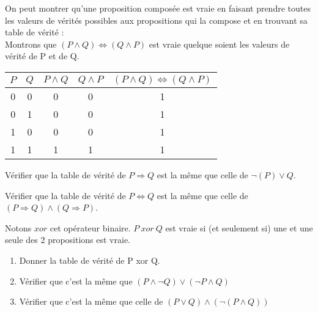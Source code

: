 \documentclass[a4paper,12pt,french]{book}
\begin{document}
\begin{methode}
	On peut montrer qu'une proposition composée est vraie en faisant prendre toutes les valeurs de vérités possibles aux propositions qui la compose et en trouvant sa table de vérité :\\
	
	Montrons que $(P\wedge Q)\Leftrightarrow(Q\wedge P)$ est vraie quelque soient les valeurs de vérité de P et de Q.
	
	\begin{center}
		\begin{tabular}{|c|c|c|c|c|}
			\hline
			\rowcolor{lightgray}
			$P$ & $Q$ & $P\wedge Q$ & $Q \wedge P$ & $(P\wedge Q)\Leftrightarrow(Q\wedge P)$\\ 
			\hline 
			\rowcolor{white}
			0 & 0 & 0 & 0 & 1\\ 
			\hline
			\rowcolor{white}
			0 & 1 & 0 & 0 & 1\\ 
			\hline
			\rowcolor{white}
			1 & 0 & 0 & 0 & 1\\ 
			\hline\rowcolor{white}
			1 & 1 & 1 & 1 & 1\\ 
			\hline
		\end{tabular} 
	\end{center}
\end{methode}

\begin{exercice}[ : l'implication]
	Vérifier que la table de vérité de $P\Rightarrow Q$ est la même que celle de $\neg(P)\vee Q$.
\end{exercice}

\begin{exercice}
	Vérifier que la table de vérité de $P\Leftrightarrow Q$ est la même que celle de $(P\Rightarrow Q)\wedge(Q\Rightarrow P)$.
\end{exercice}

\begin{exercice}[ : le ou exclusif]

		Notons $xor$ cet opérateur binaire. $P\ xor\ Q$ est vraie si (et seulement si) une et une seule des 2 propositions est vraie.
		\begin{enumerate}[\bfseries 1.]
			\item 	Donner la table de vérité de P xor Q.
			\item 	Vérifier que c'est la même que $(P\wedge \neg Q)\vee(\neg P\wedge Q)$
			\item 	Vérifier que c'est la même que celle de $(P\vee Q)\wedge(\neg(P\wedge Q))$
		\end{enumerate}
\end{exercice}
\end{document}

